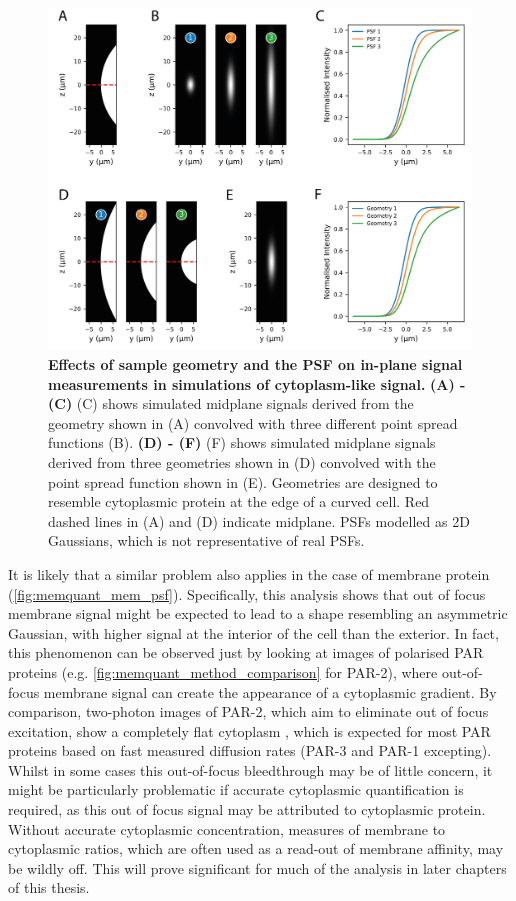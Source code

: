 \documentclass[12pt]{"article"}
\newcommand{\mycaption}[2]{\caption[#1]{\textbf{#1.} #2}}
\begin{document}
\begin{figure}
\includegraphics[scale=0.9]{memquant_cyt_psf}
\centering
\mycaption{Effects of sample geometry and the PSF on in-plane signal measurements in simulations of cytoplasm-like signal}{
\textbf{(A) - (C)} (C) shows simulated midplane signals derived from the geometry shown in (A) convolved with three different point spread functions (B).
\textbf{(D) - (F)} (F) shows simulated midplane signals derived from three geometries shown in (D) convolved with the point spread function shown in (E). Geometries are designed to resemble cytoplasmic protein at the edge of a curved cell. Red dashed lines in (A) and (D) indicate midplane. PSFs modelled as 2D Gaussians, which is not representative of real PSFs.
}
\label{fig:memquant_cyt_psf}
\end{figure}

It is likely that a similar problem also applies in the case of membrane protein (\cref{fig:memquant_mem_psf}). Specifically, this analysis shows that out of focus membrane signal might be expected to lead to a shape resembling an asymmetric Gaussian, with higher signal at the interior of the cell than the exterior. In fact, this phenomenon can be observed just by looking at images of polarised PAR proteins (e.g. \cref{fig:memquant_method_comparison} for PAR-2), where out-of-focus membrane signal can create the appearance of a cytoplasmic gradient. By comparison, two-photon images of PAR-2, which aim to eliminate out of focus excitation, show a completely flat cytoplasm \citep{Petrasek2008}, which is expected for most PAR proteins based on fast measured diffusion rates (PAR-3 and PAR-1 excepting). Whilst in some cases this out-of-focus bleedthrough may be of little concern, it might be particularly problematic if accurate cytoplasmic quantification is required, as this out of focus signal may be attributed to cytoplasmic protein. Without accurate cytoplasmic concentration, measures of membrane to cytoplasmic ratios, which are often used as a read-out of membrane affinity, may be wildly off. This will prove significant for much of the analysis in later chapters of this thesis.\\
\end{document}
